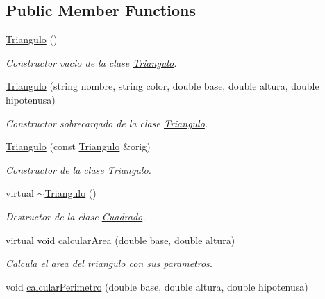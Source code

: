 \subsection*{Public Member Functions}
\begin{DoxyCompactItemize}
\item 
\hypertarget{class_triangulo_a905d421bd19655a979ccad9e2998db0c}{}\label{class_triangulo_a905d421bd19655a979ccad9e2998db0c} 
\hyperlink{class_triangulo_a905d421bd19655a979ccad9e2998db0c}{Triangulo} ()
\begin{DoxyCompactList}\small\item\em Constructor vacio de la clase \hyperlink{class_triangulo}{Triangulo}. \end{DoxyCompactList}\item 
\hyperlink{class_triangulo_ae8f507a390e27552f82f6fa232120372}{Triangulo} (string nombre, string color, double base, double altura, double hipotenusa)
\begin{DoxyCompactList}\small\item\em Constructor sobrecargado de la clase \hyperlink{class_triangulo}{Triangulo}. \end{DoxyCompactList}\item 
\hyperlink{class_triangulo_a1a7267ad3feb850a9718002420fc2fd8}{Triangulo} (const \hyperlink{class_triangulo}{Triangulo} \&orig)
\begin{DoxyCompactList}\small\item\em Constructor de la clase \hyperlink{class_triangulo}{Triangulo}. \end{DoxyCompactList}\item 
\hypertarget{class_triangulo_aca2be15b19831e8d7a5331808f5c1958}{}\label{class_triangulo_aca2be15b19831e8d7a5331808f5c1958} 
virtual \hyperlink{class_triangulo_aca2be15b19831e8d7a5331808f5c1958}{$\sim$\+Triangulo} ()
\begin{DoxyCompactList}\small\item\em Destructor de la clase \hyperlink{class_cuadrado}{Cuadrado}. \end{DoxyCompactList}\item 
virtual void \hyperlink{class_triangulo_a11f6635bf56a065274b6777f897909e8}{calcular\+Area} (double base, double altura)
\begin{DoxyCompactList}\small\item\em Calcula el area del triangulo con sus parametros. \end{DoxyCompactList}\item 
void \hyperlink{class_triangulo_a76867bdb3344be0d36d76027b810b64f}{calcular\+Perimetro} (double base, double altura, double hipotenusa)

\end{DoxyCompactItemize}
